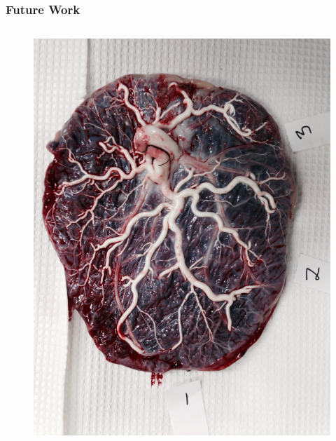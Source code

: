 \documentclass[9pt,notes]{beamer}
\begin{document}
\begin{frame} 
	\frametitle{Future Work}
\begin{columns}[c]
\begin{column}{0.5\textwidth}
\begin{figure}
\includegraphics[height=0.45\textheight]{nb}

\end{figure}
\end{column}
\end{columns}
\end{frame}
\end{document}
